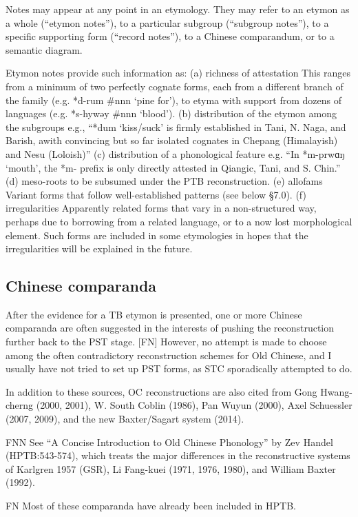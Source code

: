 Notes may appear at any point in an etymology. They may refer to an etymon as a whole (“etymon notes”), to a particular subgroup (“subgroup notes”), to a specific supporting form (“record notes”), to a Chinese comparandum, or to a semantic diagram.

Etymon notes provide such information as:
(a) richness of attestation
This ranges from a minimum of two perfectly cognate forms, each from a different branch of the family (e.g. *d-rum \#nnn ‘pine for’), to etyma with support from dozens of languages (e.g. *s-hywǝy \#nnn ‘blood’).
(b) distribution of the etymon among the subgroups
e.g., “*dum ‘kiss/suck’ is firmly established in Tani, N. Naga, and Barish, awith convincing but so far isolated cognates in Chepang (Himalayish) and Nesu (Loloish)”
(c) distribution of a phonological feature
e.g. “In *m-prwɑŋ ‘mouth’, the *m- prefix is only directly attested in Qiangic, Tani, and S. Chin.”
(d) meso-roots to be subsumed under the PTB reconstruction.
(e) allofams 
Variant forms that follow well-established patterns (see below §7.0).
(f) irregularities
Apparently related forms that vary in a non-structured way, perhaps due to borrowing from a related language, or to a now lost morphological element. Such forms are included in some etymologies in hopes that the irregularities will be explained in the future.

\subsection{Chinese comparanda}

After the evidence for a TB etymon is presented, one or more Chinese comparanda are often suggested in the interests of pushing the reconstruction further back to the PST stage. [FN] However, no attempt is made to choose among the often contradictory reconstruction schemes for Old Chinese, and I usually have not tried to set up PST forms, as STC sporadically attempted to do.

In addition to these sources, OC reconstructions are also cited from Gong Hwang-cherng (2000, 2001), W. South Coblin (1986), Pan Wuyun (2000), Axel Schuessler (2007, 2009), and the new Baxter/Sagart system (2014). 

FNN See “A Concise Introduction to Old Chinese Phonology” by Zev Handel (HPTB:543-574), which treats the major differences in the reconstructive systems of Karlgren 1957 (GSR), Li Fang-kuei (1971, 1976, 1980), and William Baxter (1992).

FN Most of these comparanda have already been included in HPTB.

